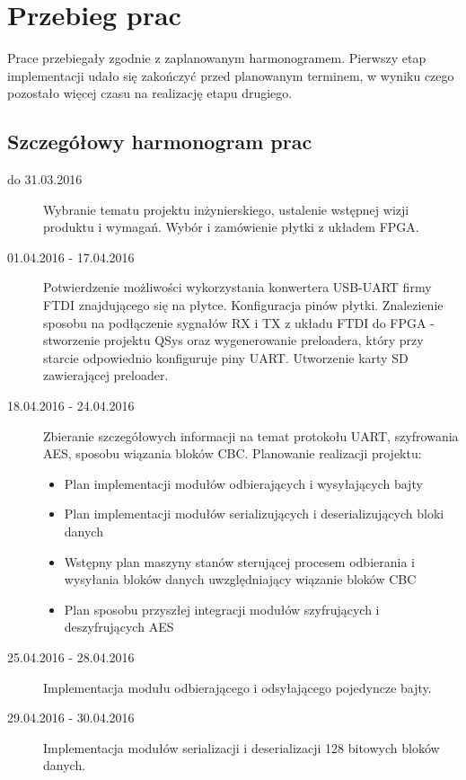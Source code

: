 \section{Przebieg prac}
\label{sec:przebieg-prac}
Prace przebiegały zgodnie z zaplanowanym harmonogramem. Pierwszy etap implementacji udało się zakończyć przed planowanym terminem, w wyniku czego pozostało więcej czasu na realizację etapu drugiego.

\subsection{Szczegółowy harmonogram prac}
\begin{description}
\item[do 31.03.2016] Wybranie tematu projektu inżynierskiego, ustalenie wstępnej wizji produktu i wymagań. Wybór i zamówienie płytki z układem FPGA.

\item[01.04.2016 - 17.04.2016] Potwierdzenie możliwości wykorzystania konwertera USB-UART firmy FTDI znajdującego się na płytce. Konfiguracja pinów płytki. Znalezienie sposobu na podłączenie sygnałów RX i TX z układu FTDI do FPGA - stworzenie projektu QSys oraz wygenerowanie preloadera, który przy starcie odpowiednio konfiguruje piny UART. Utworzenie karty SD zawierającej preloader.

\item[18.04.2016 - 24.04.2016] Zbieranie szczegółowych informacji na temat protokołu UART, szyfrowania AES, sposobu wiązania bloków CBC. Planowanie realizacji projektu:
	\begin{itemize}[noitemsep,nolistsep]
	\item Plan implementacji modułów odbierających i wysyłających bajty
	\item Plan implementacji modułów serializujących i deserializujących bloki danych
	\item Wstępny plan maszyny stanów sterującej procesem odbierania i wysyłania bloków danych uwzględniający wiązanie bloków CBC
	\item Plan sposobu przyszłej integracji modułów szyfrujących i deszyfrujących AES
	\end{itemize}

\item[25.04.2016 - 28.04.2016] Implementacja modułu odbierającego i odsyłającego pojedyncze bajty.

\item[29.04.2016 - 30.04.2016] Implementacja modułów serializacji i deserializacji 128 bitowych bloków danych.


\end{description}
